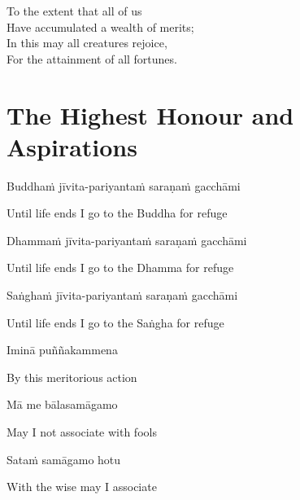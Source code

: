 \begin{cprenglish}
To the extent that all of us\\
Have accumulated a wealth of merits;\\
In this may all creatures rejoice,\\
For the attainment of all fortunes.
\end{cprenglish}


\clearpage

\section{The Highest Honour and Aspirations}

\begin{leader}
\end{leader}

Buddhaṁ jīvita-pariyantaṁ saraṇaṁ gacchāmi

\begin{cprenglish}
Until life ends I go to the Buddha for refuge
\end{cprenglish}

Dhammaṁ jīvita-pariyantaṁ saraṇaṁ gacchāmi

\begin{cprenglish}
Until life ends I go to the Dhamma for refuge
\end{cprenglish}

Saṅghaṁ jīvita-pariyantaṁ saraṇaṁ gacchāmi

\begin{cprenglish}
Until life ends I go to the Saṅgha for refuge
\end{cprenglish}

Iminā puññakammena

\begin{cprenglish}
By this meritorious action
\end{cprenglish}

Mā me bālasamāgamo

\begin{cprenglish}
May I not associate with fools
\end{cprenglish}

Sataṁ samāgamo hotu

\begin{cprenglish}
With the wise may I associate
\end{cprenglish}

